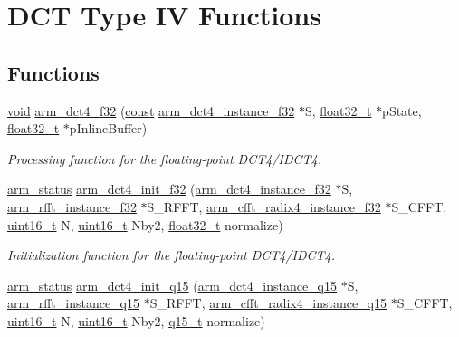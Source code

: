 \hypertarget{group___d_c_t4___i_d_c_t4}{\section{D\-C\-T Type I\-V Functions}
\label{group___d_c_t4___i_d_c_t4}
}
\subsection*{Functions}
\begin{DoxyCompactItemize}
\item 
\hyperlink{group___n_a_m_e_ga18028b8badbf1ea7e704ccac3c488e82}{void} \hyperlink{group___d_c_t4___i_d_c_t4_gafd538d68886848bc090ec2b0d364cc81}{arm\-\_\-dct4\-\_\-f32} (\hyperlink{group___n_a_m_e_ga7ae6d0e43244213b34de2c2b9aa30da6}{const} \hyperlink{structarm__dct4__instance__f32}{arm\-\_\-dct4\-\_\-instance\-\_\-f32} $\ast$S, \hyperlink{arm__math_8h_a4611b605e45ab401f02cab15c5e38715}{float32\-\_\-t} $\ast$p\-State, \hyperlink{arm__math_8h_a4611b605e45ab401f02cab15c5e38715}{float32\-\_\-t} $\ast$p\-Inline\-Buffer)
\begin{DoxyCompactList}\small\item\em Processing function for the floating-\/point D\-C\-T4/\-I\-D\-C\-T4. \end{DoxyCompactList}\item 
\hyperlink{arm__math_8h_a5e459c6409dfcd2927bb8a57491d7cf6}{arm\-\_\-status} \hyperlink{group___d_c_t4___i_d_c_t4_gab094ad3bc6fa1b84e8b12a24e1850a06}{arm\-\_\-dct4\-\_\-init\-\_\-f32} (\hyperlink{structarm__dct4__instance__f32}{arm\-\_\-dct4\-\_\-instance\-\_\-f32} $\ast$S, \hyperlink{structarm__rfft__instance__f32}{arm\-\_\-rfft\-\_\-instance\-\_\-f32} $\ast$S\-\_\-\-R\-F\-F\-T, \hyperlink{structarm__cfft__radix4__instance__f32}{arm\-\_\-cfft\-\_\-radix4\-\_\-instance\-\_\-f32} $\ast$S\-\_\-\-C\-F\-F\-T, \hyperlink{stdint_8h_a273cf69d639a59973b6019625df33e30}{uint16\-\_\-t} N, \hyperlink{stdint_8h_a273cf69d639a59973b6019625df33e30}{uint16\-\_\-t} Nby2, \hyperlink{arm__math_8h_a4611b605e45ab401f02cab15c5e38715}{float32\-\_\-t} normalize)
\begin{DoxyCompactList}\small\item\em Initialization function for the floating-\/point D\-C\-T4/\-I\-D\-C\-T4. \end{DoxyCompactList}\item 
\hyperlink{arm__math_8h_a5e459c6409dfcd2927bb8a57491d7cf6}{arm\-\_\-status} \hyperlink{group___d_c_t4___i_d_c_t4_ga966fd1b66a80873964533703ab5dc054}{arm\-\_\-dct4\-\_\-init\-\_\-q15} (\hyperlink{structarm__dct4__instance__q15}{arm\-\_\-dct4\-\_\-instance\-\_\-q15} $\ast$S, \hyperlink{structarm__rfft__instance__q15}{arm\-\_\-rfft\-\_\-instance\-\_\-q15} $\ast$S\-\_\-\-R\-F\-F\-T, \hyperlink{structarm__cfft__radix4__instance__q15}{arm\-\_\-cfft\-\_\-radix4\-\_\-instance\-\_\-q15} $\ast$S\-\_\-\-C\-F\-F\-T, \hyperlink{stdint_8h_a273cf69d639a59973b6019625df33e30}{uint16\-\_\-t} N, \hyperlink{stdint_8h_a273cf69d639a59973b6019625df33e30}{uint16\-\_\-t} Nby2, \hyperlink{arm__math_8h_ab5a8fb21a5b3b983d5f54f31614052ea}{q15\-\_\-t} normalize)

\end{DoxyCompactItemize}
